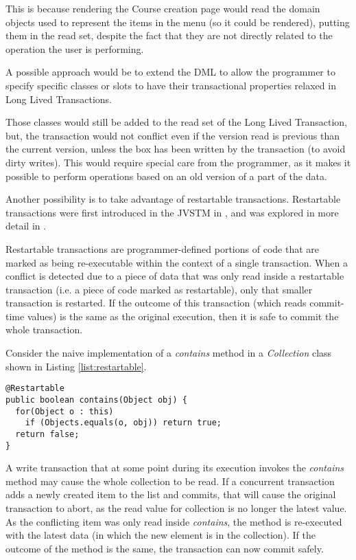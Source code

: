 This is because rendering the Course creation page would read the
domain objects used to represent the items in the menu (so it could be
rendered), putting them in the read set, despite the fact that they
are not directly related to the operation the user is performing.

A possible approach would be to extend the DML to allow the programmer
to specify specific classes or slots to have their transactional
properties relaxed in Long Lived Transactions.

Those classes would still be added to the read set of the Long Lived
Transaction, but, the transaction would not conflict even if the
version read is previous than the current version, unless the box has
been written by the transaction (to avoid dirty writes). This would
require special care from the programmer, as it makes it possible to
perform operations based on an old version of a part of the data.

Another possibility is to take advantage of restartable
transactions. Restartable transactions were first introduced in the
JVSTM in \cite{cachopo2006versioned}, and was explored in more detail
in \cite{BrunoJorgeGasparFranco2013}.

Restartable transactions are programmer-defined portions of code that
are marked as being re-executable within the context of a single
transaction. When a conflict is detected due to a piece of data that
was only read inside a restartable transaction (i.e. a piece of code
marked as restartable), only that smaller transaction is restarted. If
the outcome of this transaction (which reads commit-time values) is
the same as the original execution, then it is safe to commit the
whole transaction.

Consider the naive implementation of a {\it contains} method in a {\it
  Collection} class shown in Listing \ref{list:restartable}.

\begin{lstlisting}[caption={Restartable {\it contains} method},
  label={list:restartable}]
@Restartable
public boolean contains(Object obj) {
  for(Object o : this)
    if (Objects.equals(o, obj)) return true;
  return false;
}
\end{lstlisting}

A write transaction that at some point during its execution invokes
the {\it contains} method may cause the whole collection to be read.
If a concurrent transaction adds a newly created item to the list and
commits, that will cause the original transaction to abort, as the
read value for collection is no longer the latest value.  As the
conflicting item was only read inside {\it contains}, the method is
re-executed with the latest data (in which the new element is in the
collection). If the outcome of the method is the same, the transaction
can now commit safely.

